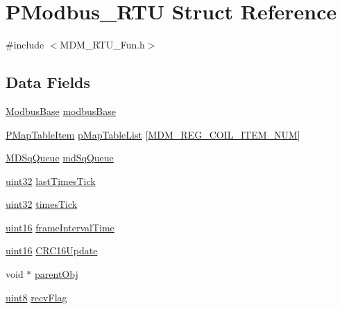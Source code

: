 \hypertarget{struct_p_modbus___r_t_u}{}\section{P\+Modbus\+\_\+\+R\+TU Struct Reference}
\label{struct_p_modbus___r_t_u}


{\ttfamily \#include $<$M\+D\+M\+\_\+\+R\+T\+U\+\_\+\+Fun.\+h$>$}

\subsection*{Data Fields}
\begin{DoxyCompactItemize}
\item 
\mbox{\hyperlink{_m_d___r_t_u___tool_8h_a6888030ca3addf2a416ddff791eb3670}{Modbus\+Base}} \mbox{\hyperlink{struct_p_modbus___r_t_u_a86bbfbee0dc7ed3234f09bafd11ea782}{modbus\+Base}}
\item 
\mbox{\hyperlink{struct_p_map_table_item}{P\+Map\+Table\+Item}} \mbox{\hyperlink{struct_p_modbus___r_t_u_a1975ceca2969ebaecf376d293c711418}{p\+Map\+Table\+List}} \mbox{[}\mbox{\hyperlink{_m_d___r_t_u___config_8h_a587b87ca2fe31f277d6b0b73d642baa4}{M\+D\+M\+\_\+\+R\+E\+G\+\_\+\+C\+O\+I\+L\+\_\+\+I\+T\+E\+M\+\_\+\+N\+UM}}\mbox{]}
\item 
\mbox{\hyperlink{_m_d___r_t_u___queue_8h_ad27ae911ca5f7b5ff69b51db46342bb4}{M\+D\+Sq\+Queue}} \mbox{\hyperlink{struct_p_modbus___r_t_u_af2a6c5c4873cee1496c84a48b320302d}{md\+Sq\+Queue}}
\item 
\mbox{\hyperlink{_m_d___r_t_u___type_8h_a1134b580f8da4de94ca6b1de4d37975e}{uint32}} \mbox{\hyperlink{struct_p_modbus___r_t_u_a9d80774322e62ae4852d1be4209f6e64}{last\+Times\+Tick}}
\item 
\mbox{\hyperlink{_m_d___r_t_u___type_8h_a1134b580f8da4de94ca6b1de4d37975e}{uint32}} \mbox{\hyperlink{struct_p_modbus___r_t_u_a0148764b78c9ff76c2105964bf00daa7}{times\+Tick}}
\item 
\mbox{\hyperlink{_m_d___r_t_u___type_8h_a05f6b0ae8f6a6e135b0e290c25fe0e4e}{uint16}} \mbox{\hyperlink{struct_p_modbus___r_t_u_ad36ceaf94794d06873de645cee2d87fd}{frame\+Interval\+Time}}
\item 
\mbox{\hyperlink{_m_d___r_t_u___type_8h_a05f6b0ae8f6a6e135b0e290c25fe0e4e}{uint16}} \mbox{\hyperlink{struct_p_modbus___r_t_u_a761d5275041fb82bed5aba0c7d1c7fb4}{C\+R\+C16\+Update}}
\item 
void $\ast$ \mbox{\hyperlink{struct_p_modbus___r_t_u_ace837120c0a0813c3f6b98eec7e028d8}{parent\+Obj}}
\item 
\mbox{\hyperlink{_m_d___r_t_u___type_8h_adde6aaee8457bee49c2a92621fe22b79}{uint8}} \mbox{\hyperlink{struct_p_modbus___r_t_u_aca6693789496535a1d2d01a76126d10d}{recv\+Flag}}
\end{DoxyCompactItemize}



